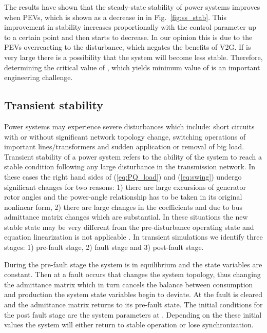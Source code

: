 \documentclass[final,12pt]{elsarticle}
\begin{document}
The results have shown that the steady-state stability of power systems improves
when PEVs, which is shown as a decrease in  in Fig.~\ref{fig:ss_stab}.
This improvement in stability increases proportionally with the
control parameter  up to a certain point and then starts to decrease.
In our opinion this is due to the PEVs
overreacting to the disturbance, which negates the benefits of V2G. If 
is very large there is a possibility that the system will become less stable.
Therefore, determining the critical value of , which yields minimum
value of  is an important engineering challenge.

\subsection{Transient stability}
\vspace{10px}

Power systems may experience severe disturbances which include:
short circuits with or without significant network topology change, switching
operations of important lines/transformers and sudden application or removal of
big load. Transient stability of a power system refers to the ability of the
system to reach a stable condition following any large disturbance in the
transmission network. In these cases the right hand sides of (\ref{eq:PQ_load})
and (\ref{eq:swing}) undergo significant changes for two reasons: 1) there are
large excursions of generator rotor angles and the power-angle relationship has
to be taken in its original nonlinear form, 2) there are large changes in the
coefficients  and  due to bus admittance matrix changes which
are substantial. In these situations the new stable state may be very different
from the pre-disturbance operating state and equation linearization is not
applicable  \cite{machowski2011power}. In transient simulations we identify
three stages: 1) pre-fault stage, 2) fault stage and 3) post-fault stage.


During the pre-fault stage the system is in equilibrium and the state variables
are constant. Then at  a fault occurs that changes the system topology,
thus changing the admittance matrix which in turn cancels the
balance between consumption and production the system state variables begin to
deviate. At  the fault is cleared and the
admittance matrix returns to its pre-fault state. The initial conditions for the
post fault stage are the system parameters at . Depending on the these
initial values the system will either return to stable operation or lose
synchronization.
\end{document}
